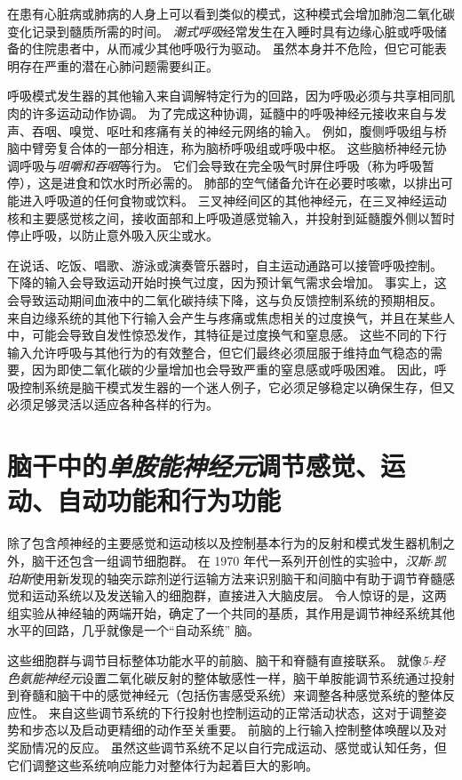 在患有心脏病或肺病的人身上可以看到类似的模式，这种模式会增加肺泡二氧化碳变化记录到髓质所需的时间。
\textit{潮式呼吸}经常发生在入睡时具有边缘心脏或呼吸储备的住院患者中，从而减少其他呼吸行为驱动。
虽然本身并不危险，但它可能表明存在严重的潜在心肺问题需要纠正。


呼吸模式发生器的其他输入来自调解特定行为的回路，因为呼吸必须与共享相同肌肉的许多运动动作协调。
为了完成这种协调，延髓中的呼吸神经元接收来自与发声、吞咽、嗅觉、呕吐和疼痛有关的神经元网络的输入。
例如，腹侧呼吸组与桥脑中臂旁复合体的一部分相连，称为脑桥呼吸组或呼吸中枢。
这些脑桥神经元协调呼吸与\textit{咀嚼和吞咽}等行为。
它们会导致在完全吸气时屏住呼吸（称为呼吸暂停），这是进食和饮水时所必需的。
肺部的空气储备允许在必要时咳嗽，以排出可能进入呼吸道的任何食物或饮料。
三叉神经间区的其他神经元，在三叉神经运动核和主要感觉核之间，接收面部和上呼吸道感觉输入，并投射到延髓腹外侧以暂时停止呼吸，以防止意外吸入灰尘或水。


在说话、吃饭、唱歌、游泳或演奏管乐器时，自主运动通路可以接管呼吸控制。
下降的输入会导致运动开始时换气过度，因为预计氧气需求会增加。
事实上，这会导致运动期间血液中的二氧化碳持续下降，这与负反馈控制系统的预期相反。
来自边缘系统的其他下行输入会产生与疼痛或焦虑相关的过度换气，并且在某些人中，可能会导致自发性惊恐发作，其特征是过度换气和窒息感。
这些不同的下行输入允许呼吸与其他行为的有效整合，但它们最终必须屈服于维持血气稳态的需要，因为即使二氧化碳的少量增加也会导致严重的窒息感或呼吸困难。
因此，呼吸控制系统是脑干模式发生器的一个迷人例子，它必须足够稳定以确保生存，但又必须足够灵活以适应各种各样的行为。



\section{脑干中的\textit{单胺能神经元}调节感觉、运动、自动功能和行为功能}

除了包含颅神经的主要感觉和运动核以及控制基本行为的反射和模式发生器机制之外，脑干还包含一组调节细胞群。
在 1970 年代一系列开创性的实验中，\textit{汉斯$\cdot$凯珀斯}使用新发现的轴突示踪剂逆行运输方法来识别脑干和间脑中有助于调节脊髓感觉和运动系统以及发送输入的细胞群，直接进入大脑皮层。
令人惊讶的是，这两组实验从神经轴的两端开始，确定了一个共同的基质，其作用是调节神经系统其他水平的回路，几乎就像是一个“自动系统” 脑。


这些细胞群与调节目标整体功能水平的前脑、脑干和脊髓有直接联系。
就像\textit{5-羟色氨能神经元}设置二氧化碳反射的整体敏感性一样，脑干单胺能调节系统通过投射到脊髓和脑干中的感觉神经元（包括伤害感受系统）来调整各种感觉系统的整体反应性。
来自这些调节系统的下行投射也控制运动的正常活动状态，这对于调整姿势和步态以及启动更精细的动作至关重要。
前脑的上行输入控制整体唤醒以及对奖励情况的反应。
虽然这些调节系统不足以自行完成运动、感觉或认知任务，但它们调整这些系统响应能力对整体行为起着巨大的影响。



